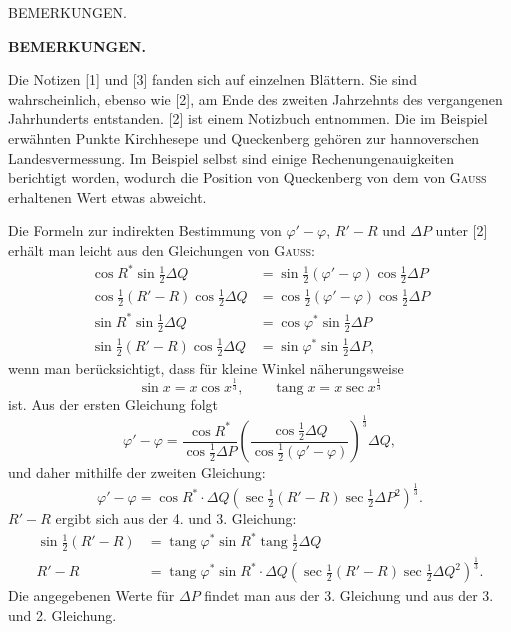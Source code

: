\clearpage
{}\hfill BEMERKUNGEN.\hfill\mbox{}\par
\vspace{12mm}
\begin{center}\textbf{BEMERKUNGEN.}\end{center}
{\small
Die Notizen [1] und [3] fanden sich auf einzelnen Blättern. Sie sind wahrscheinlich, ebenso wie [2], am Ende des zweiten Jahrzehnts des vergangenen Jahrhunderts entstanden. [2] ist einem Notizbuch entnommen. Die im Beispiel erwähnten Punkte Kirchhesepe und Queckenberg gehören zur hannoverschen Landesvermessung. Im Beispiel selbst sind einige Rechenungenauigkeiten berichtigt worden, wodurch die Position von Queckenberg von dem von \textsc{Gauss} erhaltenen Wert etwas abweicht.

Die Formeln zur indirekten Bestimmung von $\varphi'-\varphi$, $R'-R$ und $\Delta P$ unter [2] erhält man leicht aus den Gleichungen von \textsc{Gauss}:
\[
\begin{aligned}
\cos R^*\sin\tfrac12\Delta Q&=\sin\tfrac12(\varphi'-\varphi)\cos\tfrac12\Delta P\\
\cos\tfrac12(R'-R)\cos\tfrac12\Delta Q&=\cos\tfrac12(\varphi'-\varphi)\cos\tfrac12\Delta P\\
\sin R^*\sin\tfrac12\Delta Q&=\cos\varphi^*\sin\tfrac12\Delta P\\
\sin\tfrac12(R'-R)\cos\tfrac12\Delta Q&=\sin\varphi^*\sin\tfrac12\Delta P,
\end{aligned}
\]
wenn man berücksichtigt, dass für kleine Winkel näherungsweise
\[
\sin x=x\cos x^{\frac13},\qquad\operatorname{tang}x=x\sec x^{\frac13}
\]
ist. Aus der ersten Gleichung folgt
\[
\varphi'-\varphi=\frac{\cos R^*}{\cos\tfrac12\Delta P}\left(\frac{\cos\tfrac12\Delta Q}{\cos\tfrac12(\varphi'-\varphi)}\right)^{\frac13}\Delta Q,
\]
und daher mithilfe der zweiten Gleichung:
\[
\varphi'-\varphi=\cos R^*\cdot\Delta Q(\sec\tfrac12(R'-R)\sec\tfrac12\Delta P^2)^{\frac13}.
\]
$R'-R$ ergibt sich aus der 4. und 3. Gleichung:
\[
\begin{aligned}
\sin\tfrac12(R'-R)&=\operatorname{tang}\varphi^*\sin R^*\operatorname{tang}\tfrac12\Delta Q\\
R'-R&=\operatorname{tang}\varphi^*\sin R^*\cdot\Delta Q(\sec\tfrac12(R'-R)\sec\tfrac12\Delta Q^2)^{\frac13}.
\end{aligned}
\]
Die angegebenen Werte für $\Delta P$ findet man aus der 3. Gleichung und aus der 3. und 2. Gleichung.

}
